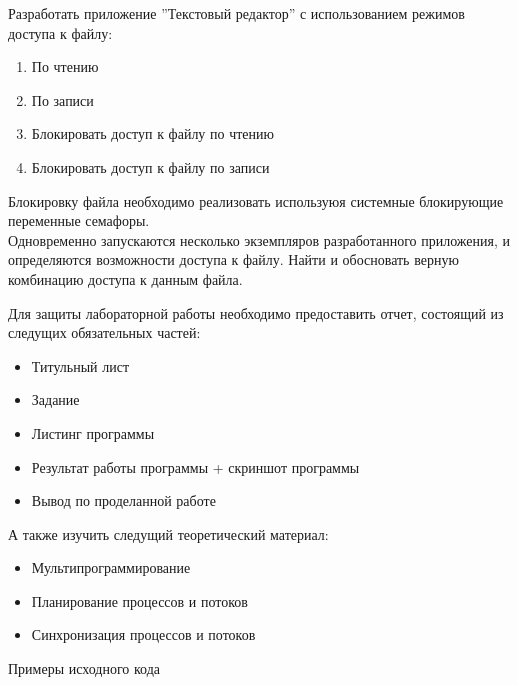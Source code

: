 \documentclass[a4paper,12pt]{article}
\begin{document}
  
  \begin{flushleft}
    Разработать приложение ''Текстовый редактор'' с использованием режимов доступа к файлу:
    
   \begin{enumerate}
     \item По чтению
     \item По записи
     \item Блокировать доступ к файлу по чтению
     \item Блокировать доступ к файлу по записи
   \end{enumerate}

  Блокировку файла необходимо реализовать используюя системные блокирующие переменные семафоры.
  \\
  Одновременно запускаются несколько экземпляров разработанного приложения, и определяются возможности доступа к файлу. Найти и обосновать верную комбинацию доступа к данным файла.

  
  Для защиты лабораторной работы необходимо предоставить отчет, состоящий из следущих обязательных частей:
  \begin{itemize}
   \item Титульный лист
   \item Задание
   \item Листинг программы
   \item Результат работы программы + скриншот программы
   \item Вывод по проделанной работе
  \end{itemize}



  А также изучить следущий теоретический материал:
  \begin{itemize}
   \item Мультипрограммирование
   \item Планирование процессов и потоков
   \item Синхронизация процессов и потоков
  \end{itemize}
\end{flushleft}

  \newpage
  \begin{center}
    \Large{Примеры исходного кода} \\[0.5em]
  \end{center}
\end{document}
